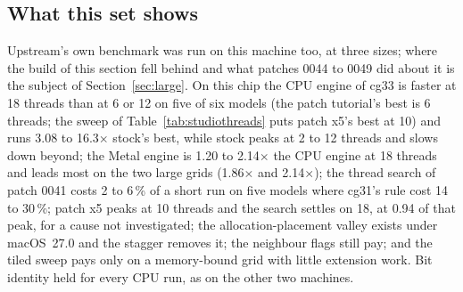 \begin{table}[H]\centering\small
{}
\caption{M5 Max: the fused sweep and the tiled sweep () of cg33's multithreaded engine, in \MC,
medians of interleaved rounds. Best tiled: the fastest of the three  rows of a model; best fused: 18 threads
on every model. The other processes used a median of 0.20 to 0.27 cores per model (at most 0.39). All runs gave probes
identical to the fused sweep's at 6 threads. The models are those of Table~\ref{tab:tiled}.
, section 7.}\label{tab:studiotiled}
\end{table}

\subsection*{What this set shows}
Upstream's own benchmark was run on this machine too, at three sizes; where the build of this section fell behind and what patches 0044 to 0049 did about it is the subject of Section~\ref{sec:large}.
On this chip the CPU engine of cg33 is faster at 18 threads than at 6 or 12 on five of six models (the patch tutorial's best is 6
threads; the sweep of Table~\ref{tab:studiothreads} puts patch x5's best at 10) and
runs 3.08 to 16.3$\times$ stock's best, while stock peaks at 2 to 12 threads and slows down beyond; the Metal engine is 1.20 to
2.14$\times$ the CPU engine at 18 threads and leads most on the two large grids (1.86$\times$ and 2.14$\times$); the thread search
of patch 0041 costs 2 to 6\,\% of a short run on five models where cg31's rule cost 14 to 30\,\%; patch x5 peaks at 10 threads and the search
settles on 18, at 0.94 of that peak, for a cause not investigated; the allocation-placement valley exists under macOS~27.0 and the stagger removes
it; the neighbour flags still pay; and the tiled sweep pays only on a memory-bound grid with little extension work. Bit identity
held for every CPU run, as on the other two machines.

